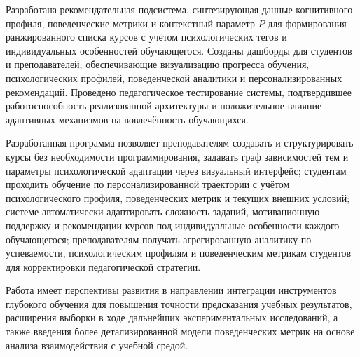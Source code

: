 \documentclass[a4paper,12pt]{article}
\begin{document}
Разработана рекомендательная подсистема, синтезирующая данные когнитивного профиля, поведенческие метрики и контекстный параметр $P$ для формирования ранжированного списка курсов с учётом психологических тегов и индивидуальных особенностей обучающегося. Созданы дашборды для студентов и преподавателей, обеспечивающие визуализацию прогресса обучения, психологических профилей, поведенческой аналитики и персонализированных рекомендаций. Проведено педагогическое тестирование системы, подтвердившее работоспособность реализованной архитектуры и положительное влияние адаптивных механизмов на вовлечённость обучающихся.

Разработанная программа позволяет преподавателям создавать и структурировать курсы без необходимости программирования, задавать граф зависимостей тем и параметры психологической адаптации через визуальный интерфейс; студентам проходить обучение по персонализированной траектории с учётом психологического профиля, поведенческих метрик и текущих внешних условий; системе автоматически адаптировать сложность заданий, мотивационную поддержку и рекомендации курсов под индивидуальные особенности каждого обучающегося; преподавателям получать агрегированную аналитику по успеваемости, психологическим профилям и поведенческим метрикам студентов для корректировки педагогической стратегии.

Работа имеет перспективы развития в направлении интеграции инструментов глубокого обучения для повышения точности предсказания учебных результатов, расширения выборки в ходе дальнейших экспериментальных исследований, а также введения более детализированной модели поведенческих метрик на основе анализа взаимодействия с учебной средой.

\pagebreak

\printbibliography

\pagebreak



\begin{appendices}
\renewcommand{\thesection}{\Asbuk{section}}
\makeatletter
\renewcommand{\theProgram}{\thesection.\@arabic\c@Program}
\makeatother

\setcounter{Program}{0}

%
\pagebreak



\end{appendices}
\end{document}
